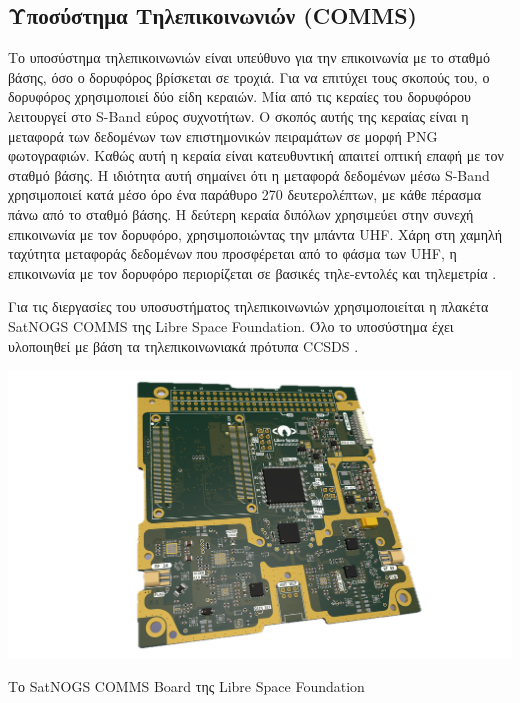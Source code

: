 \documentclass[a4paper,nobib,justified]{tufte-book}
\begin{document}
\subsection{Υποσύστημα Τηλεπικοινωνιών (\acs{COMMS})}
Το υποσύστημα τηλεπικοινωνιών είναι υπεύθυνο για την επικοινωνία με το σταθμό βάσης, όσο ο δορυφόρος βρίσκεται σε τροχιά. Για να επιτύχει τους σκοπούς του, ο δορυφόρος χρησιμοποιεί δύο είδη κεραιών. Μία από τις κεραίες του δορυφόρου λειτουργεί στο S-Band εύρος συχνοτήτων. Ο σκοπός αυτής της κεραίας είναι η μεταφορά των δεδομένων των επιστημονικών πειραμάτων σε μορφή PNG φωτογραφιών. Καθώς αυτή η κεραία είναι κατευθυντική απαιτεί οπτική επαφή με τον σταθμό βάσης. Η ιδιότητα αυτή σημαίνει ότι η μεταφορά δεδομένων μέσω S-Band χρησιμοποιεί κατά μέσο όρο ένα παράθυρο 270 δευτερολέπτων, με κάθε πέρασμα πάνω από το σταθμό βάσης. Η δεύτερη κεραία διπόλων χρησιμεύει στην συνεχή επικοινωνία με τον δορυφόρο, χρησιμοποιώντας την μπάντα UHF. Χάρη στη χαμηλή ταχύτητα μεταφοράς δεδομένων που προσφέρεται από το φάσμα των UHF, η επικοινωνία με τον δορυφόρο περιορίζεται σε βασικές τηλε-εντολές και τηλεμετρία .


Για τις διεργασίες του υποσυστήματος τηλεπικοινωνιών χρησιμοποιείται η πλακέτα SatNOGS COMMS της Libre Space Foundation. Όλο το υποσύστημα έχει υλοποιηθεί με βάση τα τηλεπικοινωνιακά πρότυπα CCSDS .

\begin{marginfigure}
	\includegraphics{media/images/satnogs-comms.png}
	\caption{Το SatNOGS COMMS Board της Libre Space Foundation}
	\label{fig:satnogs-comms}
\end{marginfigure}

\end{document}

